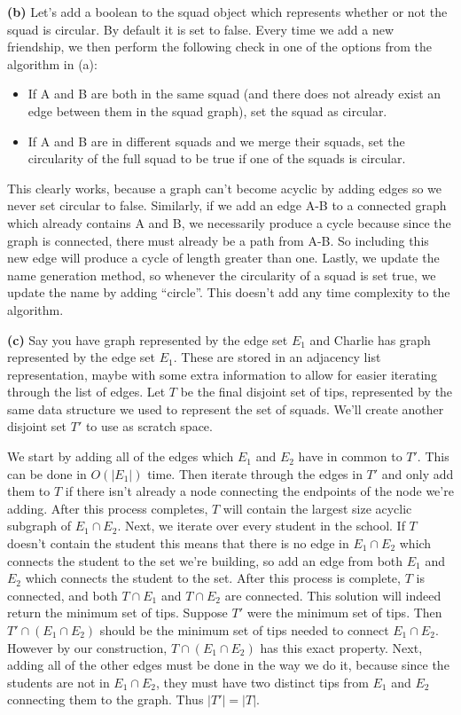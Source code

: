 \documentclass[11pt,letterpaper]{article}
\begin{document}
\begin{solution}
    \textbf{(b)} Let's add a boolean to the squad object which represents whether or not the squad is circular. By default it is set to false. Every time we add a new friendship, we then perform the following check in one of the options from the algorithm in (a):
    \begin{itemize}
        \item If A and B are both in the same squad (and there does not already exist an edge between them in the squad graph), set the squad as circular.
        \item If A and B are in different squads and we merge their squads, set the circularity of the full squad to be true if one of the squads is circular.
    \end{itemize}
    This clearly works, because a graph can't become acyclic by adding edges so we never set circular to false. Similarly, if we add an edge A-B to a connected graph which already contains A and B, we necessarily produce a cycle because since the graph is connected, there must already be a path from A-B. So including this new edge will produce a cycle of length greater than one. Lastly, we update the name generation method, so whenever the circularity of a squad is set true, we update the name by adding ``circle''. This doesn't add any time complexity to the algorithm.

    \textbf{(c)} Say you have graph represented by the edge set $E_1$ and Charlie has graph represented by the edge set $E_1$. These are stored in an adjacency list representation, maybe with some extra information to allow for easier iterating through the list of edges. Let $T$ be the final disjoint set of tips, represented by the same data structure we used to represent the set of squads. We'll create another disjoint set $T'$ to use as scratch space.

    We start by adding all of the edges which $E_1$ and $E_2$ have in common to $T'$. This can be done in $O(|E_1|)$ time. Then iterate through the edges in $T'$ and only add them to $T$ if there isn't already a node connecting the endpoints of the node we're adding. After this process completes, $T$ will contain the largest size acyclic subgraph of $E_1\cap E_2$. Next, we iterate over every student in the school. If $T$ doesn't contain the student this means that there is no edge in $E_1\cap E_2$ which connects the student to the set we're building, so add an edge from both $E_1$ and $E_2$ which connects the student to the set. After this process is complete, $T$ is connected, and both $T\cap E_1$ and $T\cap E_2$ are connected. This solution will indeed return the minimum set of tips. Suppose $T'$ were the minimum set of tips. Then $T'\cap (E_1\cap E_2)$ should be the minimum set of tips needed to connect $E_1\cap E_2$. However by our construction, $T\cap (E_1\cap E_2)$ has this exact property. Next, adding all of the other edges must be done in the way we do it, because since the students are not in $E_1\cap E_2$, they must have two distinct tips from $E_1$ and $E_2$ connecting them to the graph. Thus $|T'|=|T|$.
    
\end{solution}
\end{document}
